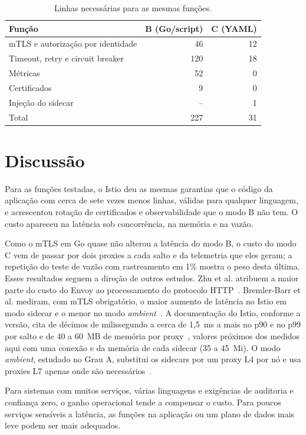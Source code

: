 \documentclass[12pt]{article}
\begin{document}
\begin{table}[ht]
\centering
\caption{Linhas necessárias para as mesmas funções.}
\label{tab:loc}
\small
\begin{tabular}{lrr}
\toprule
Função & B (Go/script) & C (YAML) \\
\midrule
mTLS e autorização por identidade & 46 & 12 \\
Timeout, retry e circuit breaker & 120 & 18 \\
Métricas & 52 & 0 \\
Certificados & 9 & 0 \\
Injeção do sidecar & -- & 1 \\
\midrule
Total & 227 & 31 \\
\bottomrule
\end{tabular}
\end{table}

\section{Discussão}

Para as funções testadas, o Istio deu as mesmas garantias que o código da
aplicação com cerca de sete vezes menos linhas, válidas para qualquer
linguagem, e acrescentou rotação de certificados e observabilidade que o modo B
não tem. O custo apareceu na latência sob concorrência, na memória e na vazão.

Como o mTLS em Go quase não alterou a latência do modo B, o custo do modo C
vem de passar por dois proxies a cada salto e da telemetria que eles geram; a
repetição do teste de vazão com rastreamento em 1\% mostra o peso desta
última. Esses resultados seguem a direção de outros estudos. Zhu et al.
atribuem a maior parte do custo do Envoy ao processamento do protocolo
HTTP~\cite{zhu2023}. Bremler-Barr et al. mediram, com mTLS obrigatório, o maior
aumento de latência no Istio em modo sidecar e o menor no modo
\emph{ambient}~\cite{barr2025}. A documentação do Istio, conforme a versão,
cita de décimos de milissegundo a cerca de 1,5~ms a mais no p90 e no p99 por
salto e de 40 a 60~MB de memória por proxy~\cite{istio-perf}, valores próximos
dos medidos aqui com uma conexão e da memória de cada sidecar (35 a 45~Mi). O
modo \emph{ambient}, estudado no Grau A, substitui os sidecars por um proxy L4
por nó e usa proxies L7 apenas onde são necessários~\cite{istio-ambient}.

Para sistemas com muitos serviços, várias linguagens e exigências de auditoria
e confiança zero, o ganho operacional tende a compensar o custo. Para poucos
serviços sensíveis a latência, as funções na aplicação ou um plano de dados
mais leve podem ser mais adequados.
\end{document}

